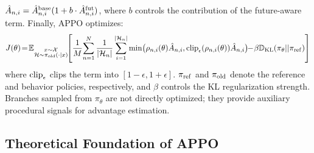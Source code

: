 \documentclass{article}
\begin{document}
$\hat{A}_{n,i}=\hat{A}^{\rm base}_{n,i}(1+b\cdot\hat{A}^{\rm fut}_{n,i})$,
where $b$ controls the contribution of the future-aware term. Finally, APPO optimizes:
\begin{equation}\label{eq:obj} 
    J(\theta)\!=\!\mathbb{E}_{\substack{x\sim\mathcal{X} \\  \mathcal{H}\sim\pi_{\rm old}(\cdot|x)}}\!\!\left[
    \frac{1}{M}\!\sum_{n=1}^N\frac{1}{|\mathcal{H}_n|}\sum_{i=1}^{|\mathcal{H}_n|}
    {\rm min}\big(\rho_{n,i}(\theta)\hat{A}_{n,i}, {\rm clip}_\epsilon(\rho_{n,i}(\theta))\hat{A}_{n,i}\big)
    \!\!-\!\beta\!\,\mathbb{D}_\mathrm{KL}(\pi_\theta||\pi_{\rm ref})
    \right]
\end{equation}
where ${\rm clip}_{\epsilon}$ clips the term into $[1-\epsilon, 1+\epsilon]$. $\pi_{\rm ref}$ and $\pi_{\rm old}$ denote the reference and behavior policies, respectively, and $\beta$ controls the KL regularization strength. Branches sampled from $\pi_\theta$ are not directly optimized; they provide auxiliary procedural signals for advantage estimation.

\subsection{Theoretical Foundation of APPO}
\end{document}
